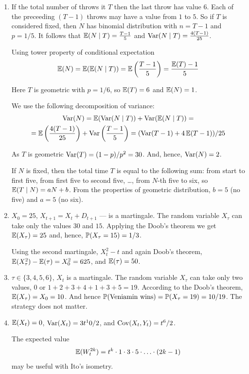 \documentclass[12pt, a4paper]{article}
\begin{document}
\begin{enumerate}
\item If the total number of throws it $T$ then the last throw has value $6$. Each of the preceeding $(T-1)$ throws may have a value from $1$ to $5$. So if $T$ is considered fixed, then $N$ has binomial distribution with $n=T-1$ and $p=1/5$. 
It follows that $\E(N \mid T)=\frac{T-1}{5}$ and $\Var(N \mid T)=\frac{4(T-1)}{25}$.

Using tower property of conditional expectation
\[
\E(N)=\E(\E(N \mid T))=\E\left( \frac{T-1}{5} \right)=\frac{\E(T)-1}{5}
\]

Here $T$ is geometric with $p=1/6$, so $\E(T)=6$ and $\E(N)=1$.

We use the following decomposition of variance:
\begin{multline}
\Var(N)=\E(\Var(N \mid T))+\Var(\E(N \mid T))=\\
=\E\left(\frac{4(T-1)}{25}\right)+\Var\left(\frac{T-1}{5}\right)=(\Var(T-1)+4\E(T-1))/25
\end{multline}

As $T$ is geometric $\Var(T)=(1-p)/p^2=30$. And, hence, $\Var(N)=2$.

If $N$ is fixed, then the total time $T$ is equal to the following sum: from start to first five, from first five to second five, \ldots, from $N$-th five to six, so $\E(T \mid N)=aN+b$. 
From the properties of geometric distribution, $b=5$ (no five) and $a=5$ (no six).

\item $X_0=25$, $X_{t+1}=X_t + D_{t+1}$ — is a martingale. The random variable $X_{\tau}$ can take only the values $30$ and $15$. Applying the Doob's theorem we get $\E(X_{\tau})=25$ and, hence, $\P(X_{\tau}=15)=1/3$.

Using the second martingale, $X^2_t-t$ and again Doob's theorem, $\E(X^2_{\tau})-\E(\tau)=X_0^2=625$, and $\E(\tau)=50$.



\item $\tau \in \{3,4,5,6\}$, $X_t$ is a martingale. The random variable $X_{\tau}$ can take only two values, $0$ or $1+2+3+4+1+3+5=19$. According to the Doob's theorem, $\E(X_{\tau})=X_0=10$. And hence $\P(\text{Veniamin wins})=\P(X_{\tau}=19)=10/19$. The strategy does not matter.

\item $\E(X_t)=0$, $\Var(X_t)=3t^10/2$, and $\Cov(X_t,Y_t)=t^6/2$.

The expected value
\[
\E(W_t^{2k})=t^k\cdot 1\cdot 3 \cdot 5 \cdot \ldots \cdot (2k-1)
\]
may be useful with Ito's isometry.


\end{enumerate}
\end{document}
